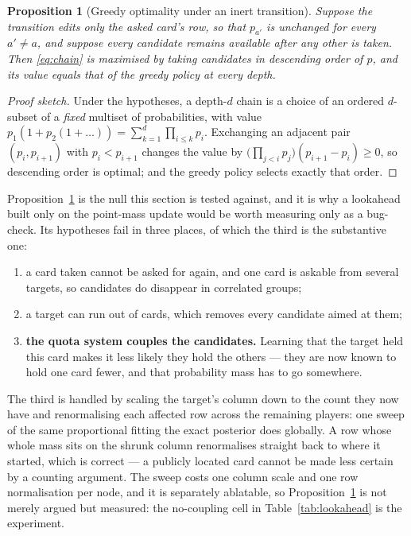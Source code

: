 \documentclass[11pt,a4paper]{article}
\newtheorem{proposition}{Proposition}
\begin{document}
\begin{proposition}[Greedy optimality under an inert transition]
\label{prop:greedy}
Suppose the transition edits only the asked card's row, so that $p_{a'}$ is
unchanged for every $a' \ne a$, and suppose every candidate remains available
after any other is taken. Then \eqref{eq:chain} is maximised by taking
candidates in descending order of $p$, and its value equals that of the greedy
policy at every depth.
\end{proposition}

\begin{proof}[Proof sketch]
Under the hypotheses, a depth-$d$ chain is a choice of an ordered $d$-subset of
a \emph{fixed} multiset of probabilities, with value
$p_{1}(1 + p_{2}(1 + \dots))= \sum_{k=1}^{d} \prod_{i \le k} p_{i}$. Exchanging
an adjacent pair $(p_i, p_{i+1})$ with $p_i < p_{i+1}$ changes the value by
$\bigl(\prod_{j<i} p_j\bigr)(p_{i+1} - p_i) \ge 0$, so descending order is
optimal; and the greedy policy selects exactly that order.
\end{proof}

Proposition~\ref{prop:greedy} is the null this section is tested against, and it
is why a lookahead built only on the point-mass update would be worth measuring
only as a bug-check. Its hypotheses fail in three places, of which the third is
the substantive one:

\begin{enumerate}
\item a card taken cannot be asked for again, and one card is askable from
several targets, so candidates do disappear in correlated groups;
\item a target can run out of cards, which removes every candidate aimed at
them;
\item \textbf{the quota system couples the candidates.} Learning that the target
held this card makes it less likely they hold the others --- they are now known
to hold one card fewer, and that probability mass has to go somewhere.
\end{enumerate}

The third is handled by scaling the target's column down to the count they now
have and renormalising each affected row across the remaining players: one sweep
of the same proportional fitting the exact posterior does globally. A row whose
whole mass sits on the shrunk column renormalises straight back to where it
started, which is correct --- a publicly located card cannot be made less
certain by a counting argument. The sweep costs one column scale and one row
normalisation per node, and it is separately ablatable, so
Proposition~\ref{prop:greedy} is not merely argued but measured: the
no-coupling cell in Table~\ref{tab:lookahead} is the experiment.
\end{document}
